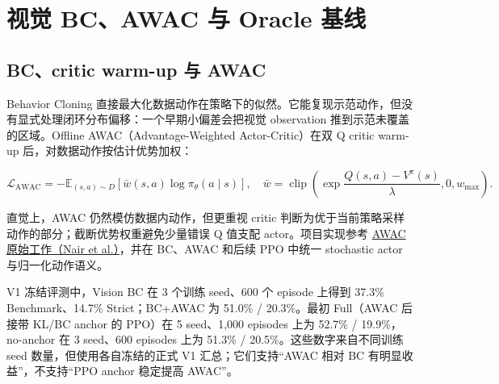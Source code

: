 \hypertarget{ux89c6ux89c9-bcawac-ux4e0e-oracle-ux57faux7ebf}{%
\section{视觉 BC、AWAC 与 Oracle 基线}\label{ux89c6ux89c9-bcawac-ux4e0e-oracle-ux57faux7ebf}}

\hypertarget{bccritic-warm-up-ux4e0e-awac}{%
\subsection{BC、critic warm-up 与 AWAC}\label{bccritic-warm-up-ux4e0e-awac}}

Behavior Cloning 直接最大化数据动作在策略下的似然。它能复现示范动作，但没有显式处理闭环分布偏移：一个早期小偏差会把视觉 observation 推到示范未覆盖的区域。Offline AWAC（Advantage-Weighted Actor-Critic）在双 Q critic warm-up 后，对数据动作按估计优势加权：

\[
\mathcal L_{\mathrm{AWAC}}
=-\mathbb E_{(s,a)\sim D}
\left[\bar w(s,a)\log\pi_\theta(a\mid s)\right],\quad
\bar w=\operatorname{clip}\!\left(\exp\frac{Q(s,a)-V^\pi(s)}{\lambda},0,w_{\max}\right).
\]

直觉上，AWAC 仍然模仿数据内动作，但更重视 critic 判断为优于当前策略采样动作的部分；截断优势权重避免少量错误 Q 值支配 actor。项目实现参考 \href{https://arxiv.org/abs/2006.09359}{AWAC 原始工作（Nair et al.）}，并在 BC、AWAC 和后续 PPO 中统一 stochastic actor 与归一化动作语义。

V1 冻结评测中，Vision BC 在 3 个训练 seed、600 个 episode 上得到 37.3\% Benchmark、14.7\% Strict；BC+AWAC 为 51.0\% / 20.3\%。最初 Full（AWAC 后接带 KL/BC anchor 的 PPO）在 5 seed、1,000 episodes 上为 52.7\% / 19.9\%，no-anchor 在 3 seed、600 episodes 上为 51.3\% / 20.5\%。这些数字来自不同训练 seed 数量，但使用各自冻结的正式 V1 汇总；它们支持``AWAC 相对 BC 有明显收益''，不支持``PPO anchor 稳定提高 AWAC''。

\autocite{nair2020awac}
